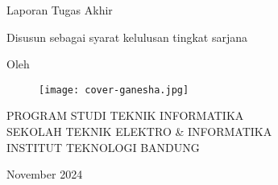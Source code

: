 \clearpage
\pagestyle{empty}

\begin{center}
  \smallskip
  
  \Large \bfseries \MakeUppercase{\thetitle}
  \vfill
  
  \Large Laporan Tugas Akhir
  \vfill
  
  \large Disusun sebagai syarat kelulusan tingkat sarjana
  \vfill
  
  \large Oleh
  
  \Large \theauthor{}
  
  \vfill
  \begin{figure}[ht]
    \centering
    \texttt{[image: cover-ganesha.jpg]}
  \end{figure}
  \vfill
  
  \large
  \uppercase{
    Program Studi Teknik Informatika \\
    Sekolah Teknik Elektro \& Informatika \\
    Institut Teknologi Bandung
  }
  
  November 2024
  
\end{center}

\clearpage
